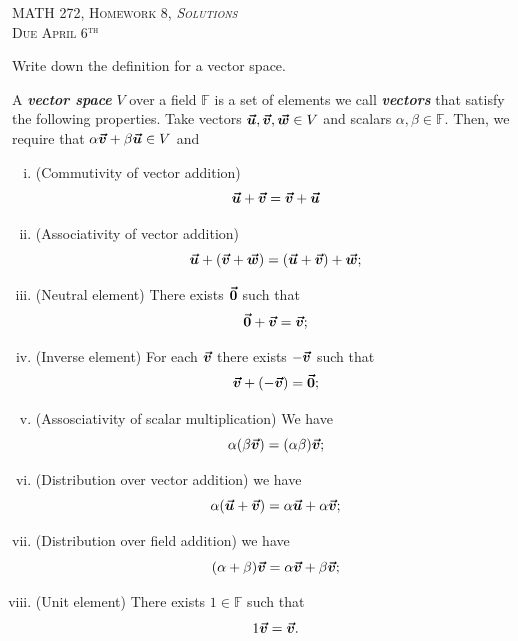 \documentclass[12pt]{article} %
\newcommand\boldblue[1]{\textcolor{nice_blue}{\emph{\textbf{#1}}}}
\begin{document}
\begin{center}
   \textsc{\large MATH 272, Homework 8, \emph{Solutions}}\\
   \textsc{Due April 6$^\textrm{th}$}
\end{center}
\vspace{.5cm}

\begin{problem}
	Write down the definition for a vector space.  
\end{problem}
\begin{solution}
	     A \boldblue{vector space} $V$ over a field $\mathbb{F}$ is a set of elements we call \boldblue{vectors} that satisfy the following properties. Take vectors $\boldsymbol{\vec{u}},\boldsymbol{\vec{v}},\boldsymbol{\vec{w}} \in V$ and scalars $\alpha, \beta \in \mathbb{F}$. Then, we require that $\alpha\boldsymbol{\vec{v}} + \beta\boldsymbol{\vec{u}} \in V$ and 
	            \begin{enumerate}[(i)]
	                \item (Commutivity of vector addition)
	                \[
	                \boldsymbol{\vec{u}}+\boldsymbol{\vec{v}}=\boldsymbol{\vec{v}}+\boldsymbol{\vec{u}}
	                \]
	                \item (Associativity of vector addition)
	                \[
	                \boldsymbol{\vec{u}}+(\boldsymbol{\vec{v}}+\boldsymbol{\vec{w}})=(\boldsymbol{\vec{u}}+\boldsymbol{\vec{v}})+\boldsymbol{\vec{w}};
	                \]
	                \item (Neutral element) There exists $\boldsymbol{\vec{0}}$ such that
	                \[
	                \boldsymbol{\vec{0}}+\boldsymbol{\vec{v}}=\boldsymbol{\vec{v}};
	                \]
	                \item (Inverse element) For each $\boldsymbol{\vec{v}}$ there exists $-\boldsymbol{\vec{v}}$ such that
	                \[
	                \boldsymbol{\vec{v}}+(-\boldsymbol{\vec{v}})=\boldsymbol{\vec{0}};
	                \]                
	                \item (Assosciativity of scalar multiplication) We have
	                \[
	                \alpha(\beta \boldsymbol{\vec{v}})=(\alpha \beta)\boldsymbol{\vec{v}};
	                \]
	                \item (Distribution over vector addition) we have
	                \[
	                \alpha(\boldsymbol{\vec{u}}+\boldsymbol{\vec{v}})=\alpha \boldsymbol{\vec{u}} + \alpha \boldsymbol{\vec{v}};
	                \]
	                \item (Distribution over field addition) we have
	                \[
	                (\alpha+\beta)\boldsymbol{\vec{v}} = \alpha \boldsymbol{\vec{v}} + \beta \boldsymbol{\vec{v}};
	                \]
	                \item (Unit element) There exists $1\in \mathbb{F}$ such that
	                \[
	                1\boldsymbol{\vec{v}} = \boldsymbol{\vec{v}}.
	                \]
	            \end{enumerate}
\end{solution}	
\end{document}
